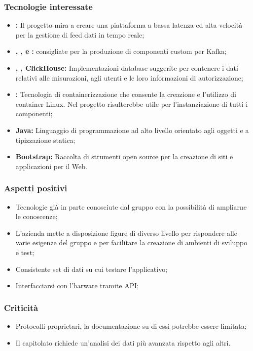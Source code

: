	\subsubsection{Tecnologie interessate}
	\begin{itemize}
		\item \textbf{:} Il progetto mira a creare una piattaforma a bassa latenza ed alta velocità per la gestione di feed dati in tempo reale;
		\item \textbf{, ,  e :}  consigliate per la produzione di componenti custom per Kafka;
		\item \textbf{, , ClickHouse:} Implementazioni database suggerite per contenere i dati relativi alle misurazioni, agli utenti e le loro informazioni di autorizzazione;
		\item \textbf{:} Tecnologia di containerizzazione che consente la creazione e l'utilizzo di container Linux. Nel progetto risulterebbe utile per l'instanziazione di tutti i componenti;   
		\item \textbf{Java:} Linguaggio di programmazione ad alto livello orientato agli oggetti e a tipizzazione statica;
		\item \textbf{Bootstrap:} Raccolta di strumenti open source per la creazione di siti e applicazioni per il Web.
	\end{itemize}
	
	\subsubsection{Aspetti positivi}
	\begin{itemize}
		\item Tecnologie già in parte conosciute dal gruppo con la possibilità di ampliarne le conoscenze;
		\item L'azienda mette a disposizione figure di diverso livello per rispondere alle varie esigenze del gruppo e per facilitare la creazione di ambienti di sviluppo e test;
		\item Consistente set di dati su cui testare l'applicativo;
		\item Interfacciarsi con l'harware tramite API;
	\end{itemize}
	
	\subsubsection{Criticità}
	\begin{itemize}
		\item Protocolli proprietari, la documentazione su di essi potrebbe essere limitata;
		\item Il capitolato richiede un'analisi dei dati più avanzata rispetto agli altri.
	\end{itemize}
	
